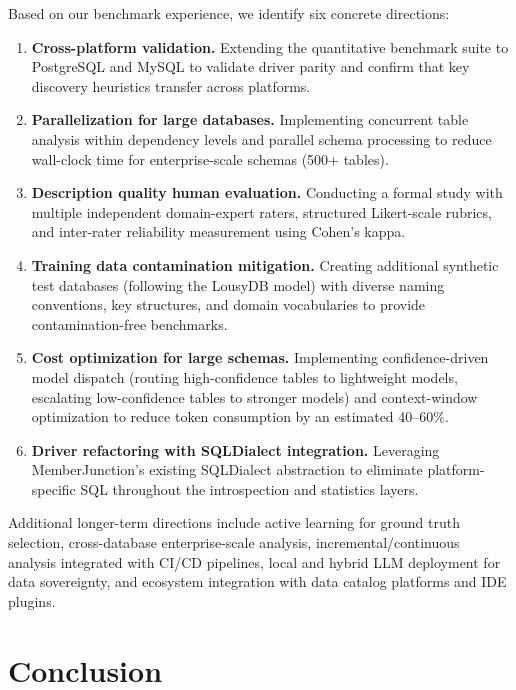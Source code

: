 \documentclass[sigconf, nonacm]{acmart}
\begin{document}
Based on our benchmark experience, we identify six concrete directions:

\begin{enumerate}
    \item \textbf{Cross-platform validation.} Extending the quantitative benchmark suite to PostgreSQL and MySQL to validate driver parity and confirm that key discovery heuristics transfer across platforms.
    \item \textbf{Parallelization for large databases.} Implementing concurrent table analysis within dependency levels and parallel schema processing to reduce wall-clock time for enterprise-scale schemas (500+ tables).
    \item \textbf{Description quality human evaluation.} Conducting a formal study with multiple independent domain-expert raters, structured Likert-scale rubrics, and inter-rater reliability measurement using Cohen's kappa.
    \item \textbf{Training data contamination mitigation.} Creating additional synthetic test databases (following the LousyDB model) with diverse naming conventions, key structures, and domain vocabularies to provide contamination-free benchmarks.
    \item \textbf{Cost optimization for large schemas.} Implementing confidence-driven model dispatch (routing high-confidence tables to lightweight models, escalating low-confidence tables to stronger models) and context-window optimization to reduce token consumption by an estimated 40--60\%.
    \item \textbf{Driver refactoring with SQLDialect integration.} Leveraging MemberJunction's existing SQLDialect abstraction to eliminate platform-specific SQL throughout the introspection and statistics layers.
\end{enumerate}

Additional longer-term directions include active learning for ground truth selection, cross-database enterprise-scale analysis, incremental/continuous analysis integrated with CI/CD pipelines, local and hybrid LLM deployment for data sovereignty, and ecosystem integration with data catalog platforms and IDE plugins.


\section{Conclusion}\label{sec:conclusion}
\end{document}
